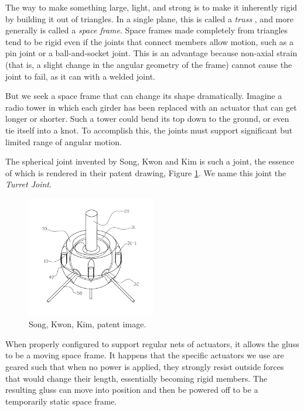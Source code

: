 \documentclass[11pt]{article}
\begin{document}
The way to make something large, light, and strong is to make it inherently rigid by building it
out of triangles. In a single plane, this is called a \emph{truss} \cite{ambrose1993building}, and more generally is called
a \emph{space frame}.  Space frames made completely from triangles tend to be rigid even if the
joints that connect members allow motion, such as a pin joint or a ball-and-socket joint. This
is an advantage because non-axial strain (that is, a slight change in the angular geometry of the frame)
cannot cause
the joint to fail, as it can with a welded joint.

But we seek a space frame that can change its shape dramatically. Imagine a radio tower in which
each girder has been replaced with an actuator that can get longer or shorter. Such a tower could
bend its top down to the ground, or even
tie itself into a knot. To accomplish this, the joints must support significant
but limited range of angular motion.

The spherical joint invented by Song, Kwon and Kim \cite{song2003spherical} is such a joint,
the essence of which is rendered in their patent drawing, Figure \ref{SongKwonKimImage}.
We name this joint the \emph{Turret Joint}.

\begin{figure}[H]
  \centering
    \includegraphics[width=0.5\textwidth]{figures/SongKwonKimImage.png}
    \caption[Song, Kwon, Kim, patent image.]{Song, Kwon, Kim, patent image.}
      \label{SongKwonKimImage}
\end{figure}

When properly configured to support regular nets of actuators,
it allows the gluss to be a moving space frame. It happens that the specific actuators we use
are geared such that when no power is applied, they strongly resist outside forces that would change their length,
essentially becoming rigid members.
The resulting gluss
can move into position and then be powered off to be a temporarily static space frame.
\end{document}
